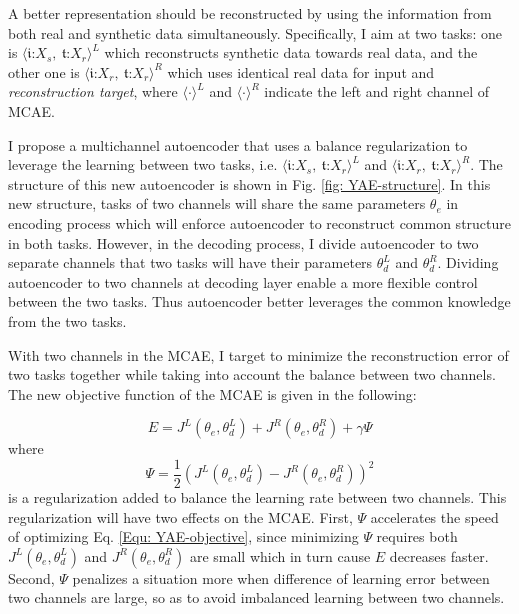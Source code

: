 \documentclass{iitthesis}
\begin{document}
A better representation should be reconstructed by using the information from both real and synthetic data simultaneously. Specifically, I aim at two tasks: one is $\langle\mathfrak{i}\text{:}X_{s},\:\mathfrak{t}\text{:}X_{r}\rangle^L$ which reconstructs synthetic data towards real data, and the other
one is $\langle\mathfrak{i}\text{:}X_{r},\:\mathfrak{t}\text{:}X_{r}\rangle^R$ which uses identical real data for input and \textit{reconstruction target}, where $\langle\cdot\rangle^{L}$ and $\langle\cdot\rangle^{R}$
indicate the left and right channel of MCAE.

 I propose a multichannel autoencoder that uses a balance regularization to leverage the learning between two tasks, i.e. $\langle\mathfrak{i}\text{:}X_{s},\:\mathfrak{t}\text{:}X_{r}\rangle^L$ and $\langle\mathfrak{i}\text{:}X_{r},\:\mathfrak{t}\text{:}X_{r}\rangle^R$. The structure of this new autoencoder is shown in Fig. \ref{fig: YAE-structure}. In this new structure, tasks of two channels will share the same parameters $\theta_{e}$ in encoding process which will enforce autoencoder to reconstruct common structure in both tasks. However, in the decoding process, I divide autoencoder to two separate channels that two tasks will have their parameters $\theta_{d}^{L}$ and $\theta_{d}^{R}$. Dividing autoencoder to two channels at decoding layer enable a more flexible control between the two tasks. Thus autoencoder better leverages the common knowledge from the two tasks. 

With two channels in the MCAE, I target to minimize the reconstruction error of two tasks together while taking into account the balance between two channels. The new objective function of the MCAE is given in the following:

\begin{equation}
E=J^{L}(\theta_{e},\theta_{d}^{L})+J^{R}(\theta_{e},\theta_{d}^{R})+\gamma\Psi\label{Equ: YAE-objective}
\end{equation}
where 
\begin{equation}
\Psi=\frac{1}{2}(J^{L}(\theta_{e},\theta_{d}^{L})-J^{R}(\theta_{e},\theta_{d}^{R}))^{2}
\end{equation}
is a regularization added to balance the learning rate between two channels. This regularization will have two effects on the MCAE. First, $\Psi$ accelerates the speed of optimizing Eq. \ref{Equ: YAE-objective}, since minimizing $\Psi$ requires both $J^{L}(\theta_{e},\theta_{d}^{L})$ and $J^{R}(\theta_{e},\theta_{d}^{R})$ are small which in turn cause $E$ decreases faster. Second, $\Psi$ penalizes a situation more when difference of learning error between two channels are large, so as to avoid imbalanced learning between two channels.
\end{document}

